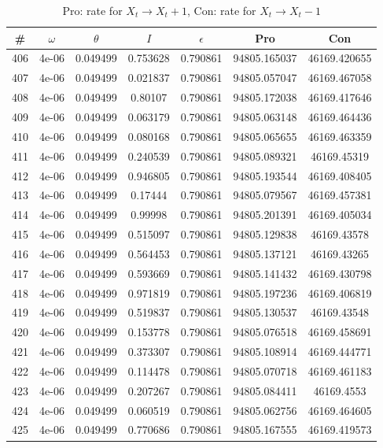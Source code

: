 \newpage
\begin{table}
\caption{Pro: rate for $X_t \rightarrow X_t + 1$, Con: rate for $X_t \rightarrow X_t - 1$}
\begin{tabular*}{\linewidth}{c|c|c|c|c|c|c}
\# & $\omega$ & $\theta$ & $I$ & $\epsilon$ & Pro & Con \\
\hline
406 & 4e-06 & 0.049499 & 0.753628 & 0.790861 & 94805.165037 & 46169.420655\\
407 & 4e-06 & 0.049499 & 0.021837 & 0.790861 & 94805.057047 & 46169.467058\\
408 & 4e-06 & 0.049499 & 0.80107 & 0.790861 & 94805.172038 & 46169.417646\\
409 & 4e-06 & 0.049499 & 0.063179 & 0.790861 & 94805.063148 & 46169.464436\\
410 & 4e-06 & 0.049499 & 0.080168 & 0.790861 & 94805.065655 & 46169.463359\\
411 & 4e-06 & 0.049499 & 0.240539 & 0.790861 & 94805.089321 & 46169.45319\\
412 & 4e-06 & 0.049499 & 0.946805 & 0.790861 & 94805.193544 & 46169.408405\\
413 & 4e-06 & 0.049499 & 0.17444 & 0.790861 & 94805.079567 & 46169.457381\\
414 & 4e-06 & 0.049499 & 0.99998 & 0.790861 & 94805.201391 & 46169.405034\\
415 & 4e-06 & 0.049499 & 0.515097 & 0.790861 & 94805.129838 & 46169.43578\\
416 & 4e-06 & 0.049499 & 0.564453 & 0.790861 & 94805.137121 & 46169.43265\\
417 & 4e-06 & 0.049499 & 0.593669 & 0.790861 & 94805.141432 & 46169.430798\\
418 & 4e-06 & 0.049499 & 0.971819 & 0.790861 & 94805.197236 & 46169.406819\\
419 & 4e-06 & 0.049499 & 0.519837 & 0.790861 & 94805.130537 & 46169.43548\\
420 & 4e-06 & 0.049499 & 0.153778 & 0.790861 & 94805.076518 & 46169.458691\\
421 & 4e-06 & 0.049499 & 0.373307 & 0.790861 & 94805.108914 & 46169.444771\\
422 & 4e-06 & 0.049499 & 0.114478 & 0.790861 & 94805.070718 & 46169.461183\\
423 & 4e-06 & 0.049499 & 0.207267 & 0.790861 & 94805.084411 & 46169.4553\\
424 & 4e-06 & 0.049499 & 0.060519 & 0.790861 & 94805.062756 & 46169.464605\\
425 & 4e-06 & 0.049499 & 0.770686 & 0.790861 & 94805.167555 & 46169.419573\\

\end{tabular*}
\end{table}
